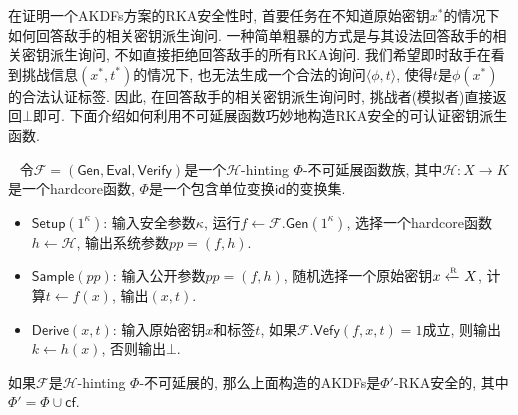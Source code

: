 在证明一个AKDFs方案的RKA安全性时, 首要任务在不知道原始密钥$x^*$的情况下如何回答敌手的相关密钥派生询问. 一种简单粗暴的方式是与其设法回答敌手的相关密钥派生询问, 不如直接拒绝回答敌手的所有RKA询问. 我们希望即时敌手在看到挑战信息$(x^*, t^*)$的情况下, 也无法生成一个合法的询问$\langle \phi, t \rangle$, 使得$t$是$\phi(x^*)$的合法认证标签. 因此, 在回答敌手的相关密钥派生询问时, 挑战者(模拟者)直接返回$\bot$即可. 下面介绍如何利用不可延展函数巧妙地构造RKA安全的可认证密钥派生函数.
\begin{construction}[基于不可延展函数的密钥派生函数]~\label{con:AKDFs}
令$\mathcal{F} = (\mathsf{Gen}, \mathsf{Eval}, \mathsf{Verify})$是一个$\mathcal{H}$-hinting $\Phi$-不可延展函数族, 其中$\mathcal{H}: X \rightarrow K$是一个hardcore函数, $\Phi$是一个包含单位变换$\mathsf{id}$的变换集.   
\begin{itemize}\itemsep 1pt \parskip 0pt \parsep 0pt
	\item $\mathsf{Setup}(1^\kappa)$: 输入安全参数$\kappa$, 运行$f \leftarrow \mathcal{F}.\mathsf{Gen}(1^\kappa)$, 选择一个hardcore函数$h \leftarrow \mathcal{H}$, 输出系统参数$pp = (f, h)$. 

	\item $\mathsf{Sample}(pp)$: 输入公开参数$pp = (f, h)$, 随机选择一个原始密钥$x \xleftarrow{\textup{\tiny R}} X$, 计算$t \leftarrow f(x)$, 输出$(x, t)$. 

	\item $\mathsf{Derive}(x, t)$: 输入原始密钥$x$和标签$t$, 如果$\mathcal{F}.\mathsf{Vefy}(f, x, t) = 1$成立, 则输出$k \leftarrow h(x)$, 否则输出$\bot$.   
\end{itemize}
\end{construction}

\begin{theorem}
如果$\mathcal{F}$是$\mathcal{H}$-hinting $\Phi$-不可延展的, 那么上面构造的AKDFs是$\Phi'$-RKA安全的, 其中$\Phi' = \Phi \cup \mathsf{cf}$. 
\end{theorem}

